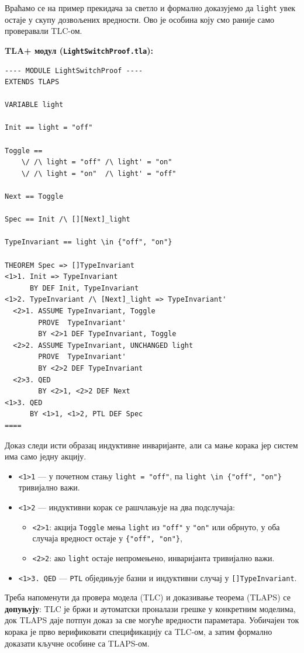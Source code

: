 \begin{primer}
Враћамо се на пример прекидача за светло и формално доказујемо да \texttt{light} увек остаје
у скупу дозвољених вредности. Ово је особина коју смо раније само проверавали TLC-ом.

\textbf{TLA+ модул (\texttt{LightSwitchProof.tla}):}
\begin{lstlisting}
---- MODULE LightSwitchProof ----
EXTENDS TLAPS

VARIABLE light

Init == light = "off"

Toggle ==
    \/ /\ light = "off" /\ light' = "on"
    \/ /\ light = "on"  /\ light' = "off"

Next == Toggle

Spec == Init /\ [][Next]_light

TypeInvariant == light \in {"off", "on"}

THEOREM Spec => []TypeInvariant
<1>1. Init => TypeInvariant
      BY DEF Init, TypeInvariant
<1>2. TypeInvariant /\ [Next]_light => TypeInvariant'
  <2>1. ASSUME TypeInvariant, Toggle
        PROVE  TypeInvariant'
        BY <2>1 DEF TypeInvariant, Toggle
  <2>2. ASSUME TypeInvariant, UNCHANGED light
        PROVE  TypeInvariant'
        BY <2>2 DEF TypeInvariant
  <2>3. QED
        BY <2>1, <2>2 DEF Next
<1>3. QED
      BY <1>1, <1>2, PTL DEF Spec
====
\end{lstlisting}

Доказ следи исти образац индуктивне инваријанте, али са мање корака јер систем има само једну акцију.

\begin{itemize}
    \item \texttt{<1>1} --- у почетном стању \texttt{light = "off"}, па \texttt{light \textbackslash in \{"off", "on"\}} тривијално важи.
    \item \texttt{<1>2} --- индуктивни корак се рашчлањује на два подслучаја:
    \begin{itemize}
        \item \texttt{<2>1}: акција \texttt{Toggle} мења \texttt{light} из \texttt{"off"} у \texttt{"on"} или обрнуто, у оба случаја вредност остаје у \texttt{\{"off", "on"\}},
        \item \texttt{<2>2}: ако \texttt{light} остаје непромењено, инваријанта тривијално важи.
    \end{itemize}
    \item \texttt{<1>3. QED} --- \texttt{PTL} обједињује базни и индуктивни случај у \texttt{[]TypeInvariant}.
\end{itemize}
\end{primer}


Треба напоменути да провера модела (TLC) и доказивање теорема (TLAPS) се \textbf{допуњују}: TLC је бржи и аутоматски
проналази грешке у конкретним моделима, док TLAPS даје потпун доказ за све могуће вредности параметара.
Уобичајен ток корака је прво верификовати спецификацију са TLC-ом, а затим формално доказати кључне особине са TLAPS-ом.

